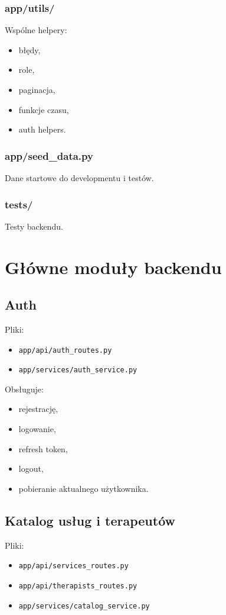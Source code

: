 \documentclass[11pt,a4paper]{article}
\begin{document}
\subsubsection*{app/utils/}
Wspólne helpery:
\begin{itemize}[leftmargin=1.2cm]
    \item błędy,
    \item role,
    \item paginacja,
    \item funkcje czasu,
    \item auth helpers.
\end{itemize}

\subsubsection*{app/seed\_data.py}
Dane startowe do developmentu i testów.

\subsubsection*{tests/}
Testy backendu.

\section{Główne moduły backendu}

\subsection{Auth}
Pliki:
\begin{itemize}[leftmargin=1.2cm]
    \item \texttt{app/api/auth\_routes.py}
    \item \texttt{app/services/auth\_service.py}
\end{itemize}

Obsługuje:
\begin{itemize}[leftmargin=1.2cm]
    \item rejestrację,
    \item logowanie,
    \item refresh token,
    \item logout,
    \item pobieranie aktualnego użytkownika.
\end{itemize}

\subsection{Katalog usług i terapeutów}
Pliki:
\begin{itemize}[leftmargin=1.2cm]
    \item \texttt{app/api/services\_routes.py}
    \item \texttt{app/api/therapists\_routes.py}
    \item \texttt{app/services/catalog\_service.py}
\end{itemize}
\end{document}
